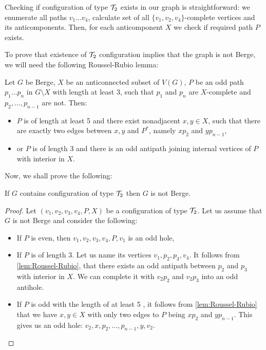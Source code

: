 Checking if configuration of type $\mathcal{T}_2$ exists in our graph is straightforward: we enumerate all paths $v_1\ldots v_4$, calculate set of all $\{v_1, v_2, v_4\}$-complete vertices and its anticomponents. Then, for each anticomponent $X$ we check if required path $P$ exists.

To prove that existence of $\mathcal{T}_2$ configuration implies that the graph is not Berge, we will need the following Roussel-Rubio lemma:

\begin{lemma}\label{lem:Roussel-Rubio}
	Let $G$ be Berge, $X$ be an anticonnected subset of $V(G)$, $P$ be an odd path $p_1\ldots p_n$ in $G\setminus X$ with length at least 3, such that $p_1$ and $p_n$ are $X$-complete and $p_2, \ldots, p_{n-1}$ are not. Then:
	\begin{itemize}
		\item $P$ is of length at least 5 and there exist nonadjacent $x, y \in X$, such that there are exactly two edges between $x, y$ and $P^*$, namely $xp_2$ and $yp_{n-1}$,
		\item or $P$ is of length 3 and there is an odd antipath joining internal vertices of $P$ with interior in $X$.
	\end{itemize}
\end{lemma}

Now, we shall prove the following:

\begin{lemma}
	If $G$ contains configuration of type $\mathcal{T}_2$ then $G$ is not Berge.
\end{lemma}
\begin{proof}
	Let $(v_1, v_2, v_3, v_4, P, X)$ be a configuration of type $\mathcal{T}_2$. Let us assume that $G$ is not Berge and consider the following:
	\begin{itemize}
		\item If $P$ is even, then $v_1, v_2, v_3, v_4, P, v_1$ is an odd hole,
		\item If $P$ is of length 3.  Let us name its vertices $v_1, p_2, p_3, v_4$. It follows from \cref{lem:Roussel-Rubio}, that there exists an odd antipath between $p_2$ and $p_3$ with interior in $X$. We can complete it with $v_2p_2$ and $v_2p_3$ into an odd antihole.
		\item If $P$ is odd with the length of at least 5 , it follows from \cref{lem:Roussel-Rubio} that we have $x, y \in X$ with only two edges to $P$ being $xp_2$ and $yp_{n-1}$. This gives us an odd hole: $v_2, x, p_2, \ldots, p_{n-1}, y, v_2$.
	\end{itemize}
\end{proof}

